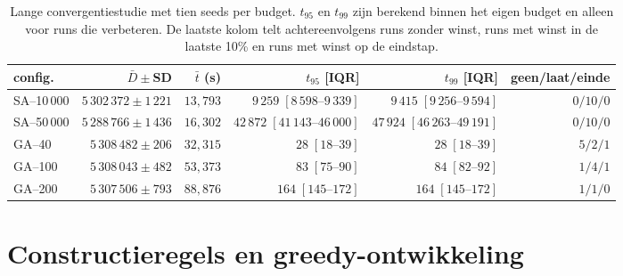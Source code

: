 \begin{table}[H]
\centering
\caption{Lange convergentiestudie met tien seeds per budget. $t_{95}$ en
$t_{99}$ zijn berekend binnen het eigen budget en alleen voor runs die
verbeteren. De laatste kolom telt achtereenvolgens runs zonder winst, runs met
winst in de laatste 10\% en runs met winst op de eindstap.}
\label{tab:app-convergence}
\begin{tabular}{@{}lrrrrr@{}}
\toprule
\textbf{config.} & \textbf{$\bar D\pm$SD} & \textbf{$\bar t$ (s)} &
\textbf{$t_{95}$ [IQR]} & \textbf{$t_{99}$ [IQR]} &
\textbf{geen/laat/einde} \\
\midrule
SA--10\,000 & $5\,302\,372\pm1\,221$ & $13,793$ & $9\,259\;[8\,598\text{--}9\,339]$ & $9\,415\;[9\,256\text{--}9\,594]$ & $0/10/0$ \\
SA--50\,000 & $5\,288\,766\pm1\,436$ & $16,302$ & $42\,872\;[41\,143\text{--}46\,000]$ & $47\,924\;[46\,263\text{--}49\,191]$ & $0/10/0$ \\
GA--40  & $5\,308\,482\pm206$ & $32,315$ & $28\;[18\text{--}39]$ & $28\;[18\text{--}39]$ & $5/2/1$ \\
GA--100 & $5\,308\,043\pm482$ & $53,373$ & $83\;[75\text{--}90]$ & $84\;[82\text{--}92]$ & $1/4/1$ \\
GA--200 & $5\,307\,506\pm793$ & $88,876$ & $164\;[145\text{--}172]$ & $164\;[145\text{--}172]$ & $1/1/0$ \\
\bottomrule
\end{tabular}
\end{table}

\endgroup

\clearpage
\section{Constructieregels en greedy-ontwikkeling}
\label{app:heuristics}

\begingroup
\footnotesize
\setlength{\tabcolsep}{2.7pt}
\setlength{\intextsep}{5pt}
\setlength{\abovecaptionskip}{3pt}
\setlength{\belowcaptionskip}{2pt}
\renewcommand{\arraystretch}{0.96}

